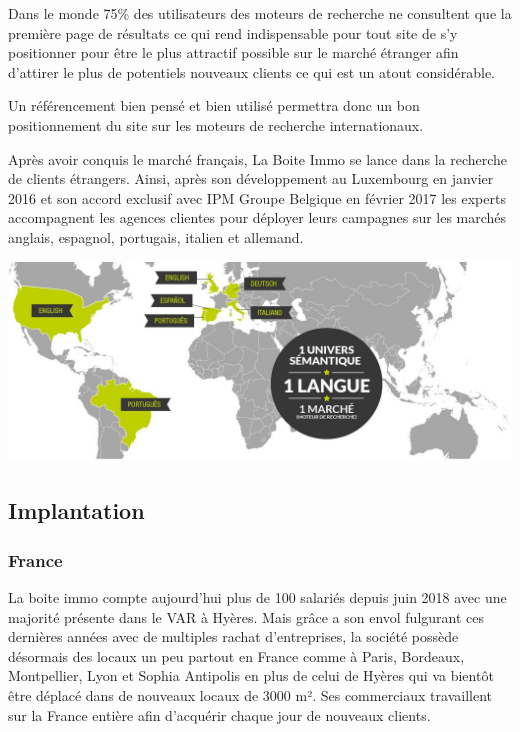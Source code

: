 \documentclass[12pt]{article}
\begin{document}
Dans le monde 75\% des utilisateurs des moteurs de recherche ne consultent que la première page de résultats ce qui rend indispensable pour tout site de s'y positionner pour être le plus attractif possible sur le marché étranger afin d'attirer le plus de potentiels nouveaux clients ce qui est un atout considérable.

Un référencement bien pensé et bien utilisé permettra donc un bon positionnement du site sur les moteurs de recherche internationaux.

Après avoir conquis le marché français, La Boite Immo se lance dans la recherche de clients étrangers. Ainsi, après son développement au Luxembourg en janvier 2016 et son accord exclusif avec IPM Groupe Belgique en février 2017 les experts accompagnent les agences clientes pour déployer leurs campagnes sur les marchés anglais, espagnol, portugais, italien et allemand.

\vspace{0.5cm}

\begin{center} \includegraphics[scale = 0.4]{map_ref_international.jpg} \end{center}

\vspace{0.5cm}
\newpage
\subsection{Implantation}
\subsubsection{France}

La boite immo compte aujourd’hui plus de 100 salariés depuis juin 2018 avec une majorité présente dans le VAR à Hyères. Mais grâce a son envol fulgurant ces dernières années avec de multiples rachat d'entreprises, la société possède désormais des locaux un peu partout en France comme à Paris, Bordeaux, Montpellier, Lyon et Sophia Antipolis en plus de celui de Hyères qui va bientôt être déplacé dans de nouveaux locaux de 3000 m².
Ses commerciaux travaillent sur la France entière afin d'acquérir chaque jour de nouveaux clients.
\vspace{0.5cm}
\end{document}
